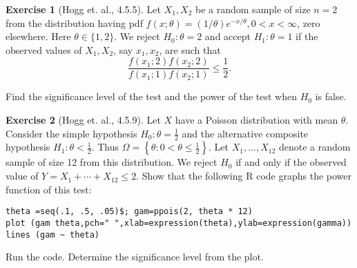 \documentclass[
  openany]{book}
\theoremstyle{definition}
\theoremstyle{definition}
\theoremstyle{definition}
\newtheorem{exercise}{Exercise}[chapter]
\theoremstyle{definition}
\theoremstyle{remark}
\begin{document}
\begin{exercise}[Hogg et. al., 4.5.5]
Let \(X_1, X_2\) be a random sample of size \(n=2\) from the distribution having pdf \(f(x ; \theta)=(1 / \theta) e^{-x / \theta}, 0<x<\infty\), zero elsewhere.
Here \(\theta \in \{1,2\}\).
We reject \(H_0: \theta=2\) and accept \(H_1: \theta=1\) if the observed values of \(X_1, X_2\), say \(x_1, x_2\), are such that
\[
\frac{f\left(x_1 ; 2\right) f\left(x_2 ; 2\right)}{f\left(x_1 ; 1\right) f\left(x_2 ; 1\right)} \leq \frac{1}{2} .
\]

Find the significance level of the test and the power of the test when \(H_0\) is false.
\end{exercise}

\begin{exercise}[Hogg et. al., 4.5.9]
Let \(X\) have a Poisson distribution with mean \(\theta\). Consider the simple hypothesis \(H_0: \theta=\frac{1}{2}\) and the alternative composite hypothesis \(H_1: \theta<\frac{1}{2}\). Thus \(\Omega=\left\{\theta: 0<\theta \leq \frac{1}{2}\right\}\). Let \(X_1, \ldots, X_{12}\) denote a random sample of size 12 from this distribution. We reject \(H_0\) if and only if the observed value of \(Y=X_1+\cdots+X_{12} \leq 2\). Show that the following \(\mathrm{R}\) code graphs the power function of this test:

\begin{verbatim}
theta =seq(.1, .5, .05)$; gam=ppois(2, theta * 12)
plot (gam theta,pch=" ",xlab=expression(theta),ylab=expression(gamma))
lines (gam ~ theta)
\end{verbatim}

Run the code. Determine the significance level from the plot.
\end{exercise}
\end{document}
